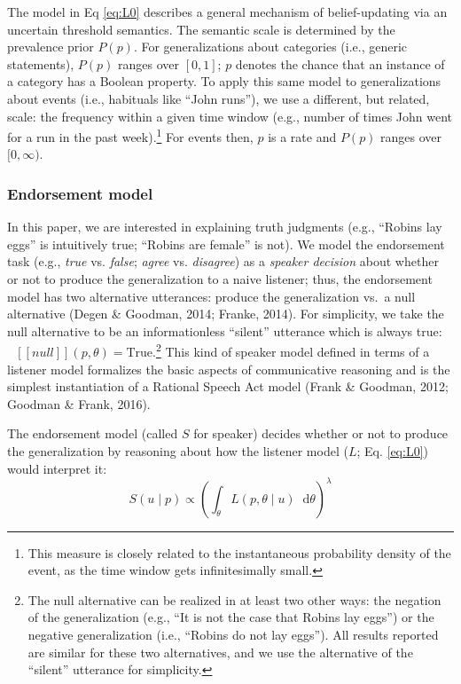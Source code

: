 \documentclass[english,,man,floatsintext]{apa6}
\let\rmarkdownfootnote\footnote%
\def\footnote{\protect\rmarkdownfootnote}
\theoremstyle{definition}
\theoremstyle{definition}
\theoremstyle{definition}
\theoremstyle{remark}
\begin{document}
The model in Eq \ref{eq:L0} describes a general mechanism of
belief-updating via an uncertain threshold semantics. The semantic scale
is determined by the prevalence prior \(P(p)\). For generalizations
about categories (i.e., generic statements), \(P(p)\) ranges over
\([0, 1]\); \(p\) denotes the chance that an instance of a category has
a Boolean property. To apply this same model to generalizations about
events (i.e., habituals like \enquote{John runs}), we use a different,
but related, scale: the frequency within a given time window (e.g.,
number of times John went for a run in the past week).\footnote{This
  measure is closely related to the instantaneous probability density of
  the event, as the time window gets infinitesimally small.} For events
then, \(p\) is a rate and \(P(p)\) ranges over \([0, \infty)\).

\hypertarget{endorsement-model}{%
\subsubsection{Endorsement model}\label{endorsement-model}}

In this paper, we are interested in explaining truth judgments (e.g.,
\enquote{Robins lay eggs} is intuitively true; \enquote{Robins are
female} is not). We model the endorsement task (e.g., \emph{true} vs.
\emph{false}; \emph{agree} vs. \emph{disagree}) as a \emph{speaker
decision} about whether or not to produce the generalization to a naive
listener; thus, the endorsement model has two alternative utterances:
produce the generalization vs.~a null alternative (Degen \& Goodman,
2014; Franke, 2014). For simplicity, we take the null alternative to be
an informationless \enquote{silent} utterance which is always true:
\(\mbox{ $[\![ null ]\!]$}(p, \theta) = \text{True}\).\footnote{The null
  alternative can be realized in at least two other ways: the negation
  of the generalization (e.g., \enquote{It is not the case that Robins
  lay eggs}) or the negative generalization (i.e., \enquote{Robins do
  not lay eggs}). All results reported are similar for these two
  alternatives, and we use the alternative of the \enquote{silent}
  utterance for simplicity.} This kind of speaker model defined in terms
of a listener model formalizes the basic aspects of communicative
reasoning and is the simplest instantiation of a Rational Speech Act
model (Frank \& Goodman, 2012; Goodman \& Frank, 2016).

The endorsement model (called \(S\) for speaker) decides whether or not
to produce the generalization by reasoning about how the listener model
(\(L\); Eq. \ref{eq:L0}) would interpret it: \begin{equation}
S(u \mid p) \propto (\int_{\theta} L(p, \theta \mid u)  \mathop{}\!\mathrm{d}\theta)^\lambda
\label{eq:S1}
\end{equation}
\end{document}

